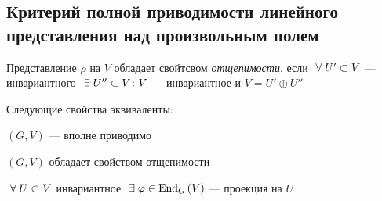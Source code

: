 \subsection{Критерий полной приводимости линейного представления над произвольным полем}
\begin{df}
	Представление $\rho$ на $V$ обладает свойтсвом \textit{отщепимости},
	если $~\forall\; U' \subset V$ --- инвариантного $~\exists\; U'' \subset V \colon V$ --- инвариантное
	и $V = U' \oplus U''$
\end{df}
\begin{stm}
	Следующие свойства эквиваленты:
	\begin{points}{-3}
		\item $(G, V)$ --- вполне приводимо
		\item $(G, V)$ обладает свойством отщепимости
		\item $~\forall\; U \subset V$ инвариантное $~\exists\; \varphi \in \operatorname{End}_G\left(V\right)$ --- проекция на $U$ 
	\end{points}
\end{stm}
